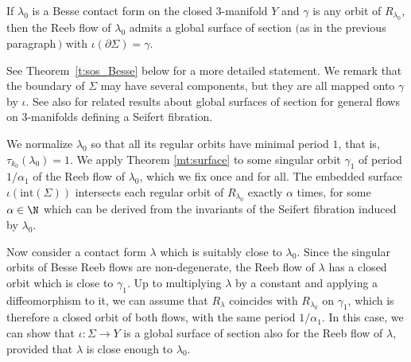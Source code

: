 \begin{maintheorem}
\label{mt:surface}
If $\lambda_0$ is a Besse contact form on the closed $3$-manifold $Y$ and $\gamma$ is any orbit of $R_{\lambda_0}$, then the Reeb flow of $\lambda_0$ admits a global surface of section $($as in the previous paragraph$\,)$ with $\iota(\partial \Sigma) = \gamma$.
\end{maintheorem}

See Theorem~\ref{t:sos_Besse} below for a more detailed statement. We remark that the boundary of $\Sigma$ may have several components, but they are all mapped onto $\gamma$ by $\iota$. See also \cite{Albach:2021wi} for related results about global surfaces of section for general flows on 3\nobreakdash-manifolds defining a Seifert fibration.

We normalize $\lambda_0$ so that all its regular orbits have minimal period $1$, that is, $\tau_{k_0}(\lambda_0)=1$. We apply Theorem \ref{mt:surface} to some singular orbit $\gamma_1$ of period $1/\alpha_1$ of the Reeb flow of $\lambda_0$, which we fix once and for all. The embedded surface $\iota(\mathrm{int}(\Sigma))$ intersects each regular orbit of $R_{\lambda_0}$ exactly $\alpha$ times, for some $\alpha\in \N$ which can be derived from the invariants of the Seifert fibration induced by $\lambda_0$.

Now consider a contact form $\lambda$ which is suitably close to $\lambda_0$. Since the singular orbits of Besse Reeb flows are non-degenerate, the Reeb flow of $\lambda$ has a closed orbit which is close to $\gamma_1$. Up to multiplying $\lambda$ by a constant and applying a diffeomorphism to it, we can assume that $R_{\lambda}$ coincides with $R_{\lambda_0}$ on $\gamma_1$, which is therefore a closed orbit of both flows, with the same period $1/\alpha_1$. In this case, we can show that $\iota:\Sigma \to Y$ is a global surface of section also for the Reeb flow of $\lambda$, provided that $\lambda$ is close enough to $\lambda_0$.

